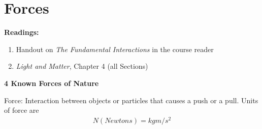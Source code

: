 \documentclass[12pt]{article}
\begin{document}
\section{Forces}

\noindent \textbf{Readings:}
\begin{enumerate}
\item Handout on \textit{The Fundamental Interactions} in the course reader
\item \textit{Light and Matter}, Chapter 4 (all Sections)
\end{enumerate}

\noindent\textbf{4 Known Forces of Nature}

Force: Interaction between objects or particles that causes a push or a pull.
Units of force are
\begin{eqnarray}
N (Newtons) = kg m/s^2 \nonumber
\end{eqnarray}
\end{document}
